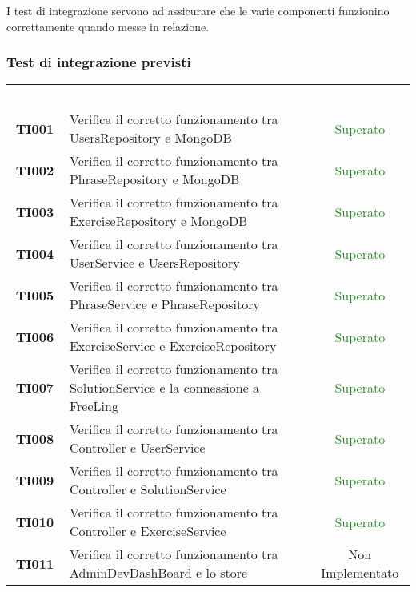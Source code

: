 I test di integrazione servono ad assicurare che le varie componenti funzionino correttamente quando messe in relazione.


\subsubsection{Test di integrazione previsti}

\begin{tabularx}{\textwidth}{cXc}
	
	\rowcolor{greySWEight}
	
	\rowcolor{greySWEight}
	\textcolor{white}{\textbf{Codice}} & 
	\textcolor{white}{\textbf{Descrizione}} &
	\textcolor{white}{\textbf{Stato}} \\

\textbf{TI001} & Verifica il corretto funzionamento tra UsersRepository e MongoDB & \textcolor{ForestGreen}{Superato} \\
\textbf{TI002} & Verifica il corretto funzionamento tra PhraseRepository e MongoDB & \textcolor{ForestGreen}{Superato} \\
\textbf{TI003} & Verifica il corretto funzionamento tra ExerciseRepository e MongoDB & \textcolor{ForestGreen}{Superato} \\
\textbf{TI004} & Verifica il corretto funzionamento tra UserService e UsersRepository & \textcolor{ForestGreen}{Superato} \\
\textbf{TI005} & Verifica il corretto funzionamento tra PhraseService e PhraseRepository & \textcolor{ForestGreen}{Superato} \\
\textbf{TI006} & Verifica il corretto funzionamento tra ExerciseService e ExerciseRepository & \textcolor{ForestGreen}{Superato} \\
\textbf{TI007} & Verifica il corretto funzionamento tra SolutionService e la connessione a FreeLing & \textcolor{ForestGreen}{Superato} \\
\textbf{TI008} & Verifica il corretto funzionamento tra Controller e UserService & \textcolor{ForestGreen}{Superato} \\
\textbf{TI009} & Verifica il corretto funzionamento tra Controller e SolutionService & \textcolor{ForestGreen}{Superato} \\
\textbf{TI010} & Verifica il corretto funzionamento tra Controller e ExerciseService & \textcolor{ForestGreen}{Superato} \\
\textbf{TI011} & Verifica il corretto funzionamento tra AdminDevDashBoard e lo store	& Non Implementato	\\

\end{tabularx}
